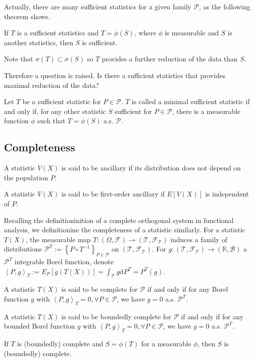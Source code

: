 Actually, there are many sufficient statistics for a given family $\mathcal{P}$, as the following theorem shows.
\begin{theorem}
If $T$ is a sufficient statistics and $T=\phi(S)$, where $\phi$ is measurable and $S$ is another statistics, then $S$ is sufficient.
\end{theorem}

\begin{remark}
Note that $\sigma(T)\subset\sigma(S)$ so $T$ provides a further reduction of the data than $S$.
\end{remark}
Therefore a question is raised. Is there a sufficient statistics that provides maximal reduction of the data?
\begin{definition}
Let $T$ be a sufficient statistic for $P\in\mathcal{P}$. $T$ is called a minimal sufficient statistic if and only if, for any other statistic $S$ sufficient for $P\in\mathcal{P}$, there is a measurable function $\phi$ such that $T=\phi(S)$ a.s. $\mathcal{P}$.
\end{definition}
\subsection{Completeness}
\begin{definition}[ancillary]
A statistic $V(X)$ is said to be ancillary if its distribution does not depend on the population $P$.
\end{definition}
\begin{definition}
A statistic $V(X)$ is said to be first-order ancillary if $E[V(X)]$ is independent of $P$.
\end{definition}
Recalling the definitioninition of a complete orthogonal system in functional analysis, we definitionine the completeness of a statistic similarly. For a statistic $T(X)$, the measurable map $T:(\Omega,\mathcal{F})\longrightarrow(\mathcal{T},\mathcal{F}_\mathcal{T})$ induces a family of distributions $\mathcal{P}^T:=\left\{P\circ T^{-1}\right\}_{P\in\mathcal{P}}$ on $(\mathcal{T},\mathcal{F}_\mathcal{T})$. For $g:(\mathcal{T},\mathcal{F}_\mathcal{T})\longrightarrow(\mathbb{R},\mathcal{B})$ a $\mathcal{P}^T$ integrable Borel function, denote $\left\langle P,g\right\rangle_T:=E_P[g(T(X))]=\int_\mathcal{T}g\mathrm{d}P^T=P^T(g)$.
\begin{definition}[completeness]
A statistic $T(X)$ is said to be complete for $\mathcal{P}$ if and only if for any Borel function $g$ with $\left\langle P,g\right\rangle_T=0,\forall P\in\mathcal{P}$, we have $g=0$ a.s. $\mathcal{P}^T$.
\end{definition}
\begin{definition}
A statistic $T(X)$ is said to be boundedly complete for $\mathcal{P}$ if and only if for any bounded Borel function $g$ with $\left\langle P,g\right\rangle_T=0,\forall P\in\mathcal{P}$, we have $g=0$ a.s. $\mathcal{P}^T$.
\end{definition}
\begin{remark}
If $T$ is (boundedly) complete and $S=\phi(T)$ for a measurable $\phi$, then $S$ is (boundedly) complete.
\end{remark}
